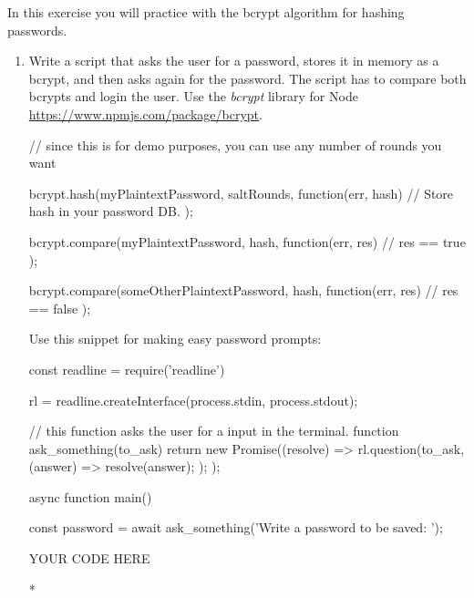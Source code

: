 \begin{Exercise}[label={basic-js-crypto-bcrypt}]
In this exercise you will practice with the bcrypt algorithm for hashing passwords.

\begin{enumerate}[1.]
\item Write a script that asks the user for a password, stores it in memory as a bcrypt, and then asks again for the password. The script has to compare both bcrypts and login the user. Use the \textit{bcrypt} library for Node \url{https://www.npmjs.com/package/bcrypt}.

\begin{js}
// since this is for demo purposes, you can use any number of rounds you want

bcrypt.hash(myPlaintextPassword, saltRounds, function(err, hash) {
// Store hash in your password DB.
});

bcrypt.compare(myPlaintextPassword, hash, function(err, res) {
// res == true
});

bcrypt.compare(someOtherPlaintextPassword, hash, function(err, res) {
// res == false
});
\end{js}

Use this snippet for making easy password prompts:
\begin{js}
  
const readline = require('readline')

rl = readline.createInterface(process.stdin, process.stdout);
  
// this function asks the user for a input in the terminal.
function ask_something(to_ask) {
  return new Promise((resolve) => {
    rl.question(to_ask, (answer) => {
      resolve(answer);
    });
  });
}

async function main() {
  const password = await ask_something('Write a password to be saved: ');
  
  \*
  
  YOUR CODE HERE
  
  *\
}
\end{js}
\end{enumerate}
\end{Exercise}

